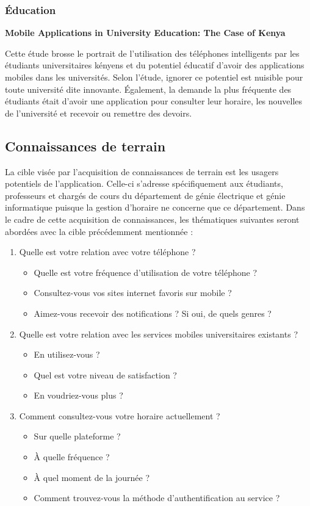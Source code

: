 		\subsubsection{Éducation}
		{\bfseries \cite{kenya} Mobile Applications in University Education: The Case of Kenya}
		
		Cette étude brosse le portrait de l'utilisation des téléphones intelligents par les étudiants universitaires kényens et du potentiel éducatif d'avoir des applications mobiles dans les universités. Selon l'étude, ignorer ce potentiel est nuisible pour toute université dite innovante. Également, la demande la plus fréquente des étudiants était d'avoir une application pour consulter leur horaire, les nouvelles de l'université et recevoir ou remettre des devoirs.
	
	\subsection{Connaissances de terrain}
	La cible visée par l'acquisition de connaissances de terrain est les usagers potentiels de l'application. Celle-ci s'adresse spécifiquement aux étudiants, professeurs et chargés de cours du département de génie électrique et génie informatique puisque la gestion d'horaire ne concerne que ce département. Dans le cadre de cette acquisition de connaissances, les thématiques suivantes seront abordées avec la cible précédemment mentionnée :

	\begin{enumerate}
		\item Quelle est votre relation avec votre téléphone ?
		\begin{itemize}
			\item Quelle est votre fréquence d'utilisation de votre téléphone ?
			\item Consultez-vous vos sites internet favoris sur mobile ?
			\item Aimez-vous recevoir des notifications ? Si oui, de quels genres ?
		\end{itemize}
		\item Quelle est votre relation avec les services mobiles universitaires existants ?
		\begin{itemize}
			\item En utilisez-vous ?
			\item Quel est votre niveau de satisfaction ?
			\item En voudriez-vous plus ?
		\end{itemize}
		\item Comment consultez-vous votre horaire actuellement ?
		\begin{itemize}
			\item Sur quelle plateforme ?
			\item À quelle fréquence ?
			\item À quel moment de la journée ?
			\item Comment trouvez-vous la méthode d'authentification au service ?
		\end{itemize}
	\end{enumerate}
	
